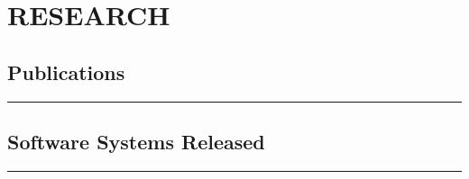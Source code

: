 \section*{RESEARCH}

\subsection*{Publications}
\hrule
\vspace{0.2cm}





\subsection*{Software Systems Released}
\hrule
\vspace{0.2cm}

